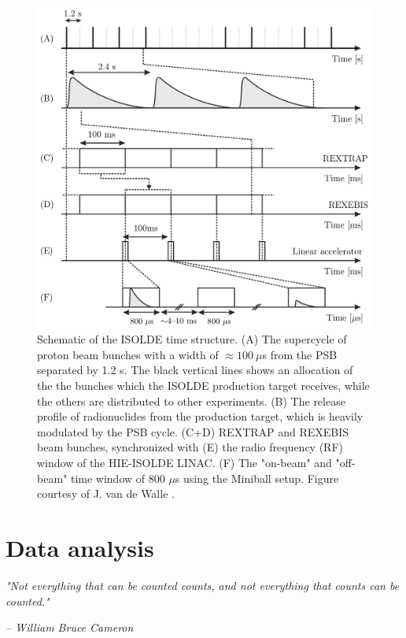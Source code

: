 \documentclass[twoside,english]{uiofysmaster/uiofysmaster}
\begin{document}
\begin{figure}[ht]
	\centering
	\includegraphics[width=\textwidth]{Images/Time-structure.png}
	\caption{Schematic of the ISOLDE time structure. (A) The supercycle of proton beam bunches with a width of $\approx 100 ~\mu$s from the PSB separated by 1.2 s. The black vertical lines shows an allocation of the the bunches which the ISOLDE production target receives, while the others are distributed to other experiments. (B) The release profile of radionuclides from the production target, which is heavily modulated by the PSB cycle. (C+D) REXTRAP and REXEBIS beam bunches, synchronized with (E) the radio frequency (RF) window of the HIE-ISOLDE LINAC. (F) The "on-beam" and "off-beam" time window of 800 $\mu$s using the Miniball setup. Figure courtesy of J. van de Walle \cite{HI-TDR}.}
	\label{fig:ITS}
\end{figure}




\chapter{Data analysis}\label{ch:DA}
\epigraph{\textit{"Not everything that can be counted counts, and not everything that counts can be counted."}}{\textit{– William Bruce Cameron}}
\end{document}
